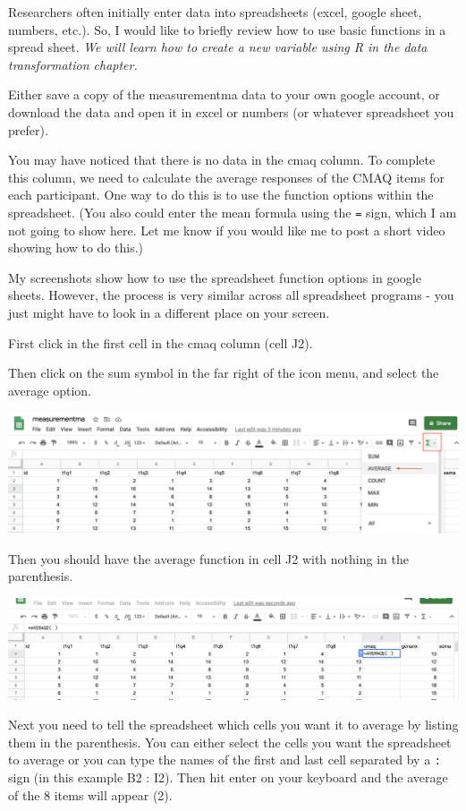 \documentclass[
]{book}
\begin{document}
Researchers often initially enter data into spreadsheets (excel, google sheet, numbers, etc.). So, I would like to briefly review how to use basic functions in a spread sheet. \emph{We will learn how to create a new variable using R in the data transformation chapter.}

Either save a copy of the measurementma data to your own google account, or download the data and open it in excel or numbers (or whatever spreadsheet you prefer).

You may have noticed that there is no data in the cmaq column. To complete this column, we need to calculate the average responses of the CMAQ items for each participant. One way to do this is to use the function options within the spreadsheet. (You also could enter the mean formula using the \texttt{=} sign, which I am not going to show here. Let me know if you would like me to post a short video showing how to do this.)

My screenshots show how to use the spreadsheet function options in google sheets. However, the process is very similar across all spreadsheet programs - you just might have to look in a different place on your screen.

First click in the first cell in the cmaq column (cell J2).

Then click on the sum symbol in the far right of the icon menu, and select the average option.

\includegraphics{img/averagefun.png}

Then you should have the average function in cell J2 with nothing in the parenthesis.

\includegraphics{img/averagefun2.png}

Next you need to tell the spreadsheet which cells you want it to average by listing them in the parenthesis. You can either select the cells you want the spreadsheet to average or you can type the names of the first and last cell separated by a \texttt{:} sign (in this example B2 : I2). Then hit enter on your keyboard and the average of the 8 items will appear (2).
\end{document}
